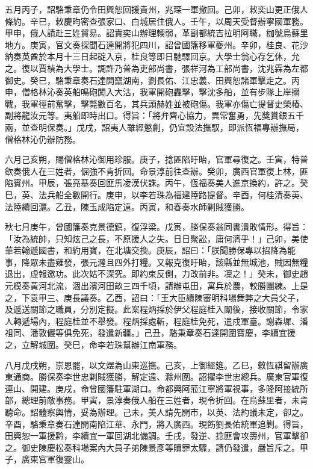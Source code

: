 \begin{pinyinscope}
五月丙子，詔駱秉章仍令田興恕回援貴州，兆琛一軍撤回。己卯，敕奕山更正俄人條約。辛巳，敕慶昀密查張家口、白城居住俄人。壬午，以周天受督辦寧國軍務。甲申，俄人請赴三姓貿易。詔責奕山辦理輭弱，革副都統吉拉明阿職，枷號烏蘇里地方。庚寅，官文奏探聞石達開將犯四川，詔曾國籓移軍夔州。辛卯，桂良、花沙納奏英酋於本月十三日起碇入京，桂良等即日馳驛回京。大學士翁心存乞休，允之。復以賈楨為大學士。調許乃普為吏部尚書，張祥河為工部尚書，沈兆霖為左都御史。癸巳，駱秉章奏石達開竄湖南，劉長佑、江忠義、田興恕諸軍擊走之。丙申，僧格林沁奏英船鳴砲闖入大沽，我軍開砲轟擊，擊沈多船，並有步隊上岸搦戰，我軍徑前奮擊，擊斃數百名，其兵頭赫姓並被砲傷。我軍亦傷亡提督史榮椿、副將龍汝元等。夷船即時出口。得旨：「將弁齊心協力，異常奮勇，先獎賞銀五千兩，並查明保奏。」戊戌，詔夷人雖經懲創，仍宜設法撫馭，即派恆福專辦撫局，僧格林沁仍辦防務。

六月己亥朔，賜僧格林沁御用珍服。庚子，捻匪陷盱眙，官軍尋復之。壬寅，特普欽奏俄人在三姓者，倔強不肯折回。命景淳前往查辦。癸卯，廣西官軍復上林，匪陷賓州。甲辰，張亮基奏回匪馬凌漢伏誅。丙午，恆福奏美人進京換約，許之。癸巳，英、法兵船全數開行。庚申，以李若珠為福建陸路提督。辛酉，何桂清奏英、法陸續回滬。乙丑，陳玉成陷定遠。丙寅，和春奏水師剿賊獲勝。

秋七月庚午，曾國籓奏克景德鎮，復浮梁。戊寅，勝保奏翁同書潰敗情形。得旨：「汝為統帥，只知炫己之長，不原援人之失。日日聚訟，庸何濟乎！」己卯，美使華若翰遞國書，和約用寶，在北塘交換。庚辰，詔曰：「朕聞勝保專以招降為能事，降眾未盡薙發，張元漋且四外打糧。又報克復盱眙，該縣並無城池，賊因無糧退出，虛報邀功。此次姑不深究。即約束反側，力改前非。凜之！」癸未，御史趙元模奏黃河北流，涸出濱河田畝三四千頃，請辦屯田，寓兵於農，較勝團練。上是之，下袁甲三、庚長議奏。乙酉，詔曰：「王大臣續陳審明科場舞弊之大員父子，及遞送關節之職員，分別定擬。此案程炳採於伊父程庭桂入闈後，接收關節，令家人轉遞場內，程庭桂並不舉發。程炳採處斬，程庭桂免死，遣戍軍臺。謝森墀、潘祖同、潘敦儼等俱免死，發遣新疆。」己丑，駱秉章奏石達開圍寶慶，李續宜援之，立解城圍。癸巳，命李若珠幫辦江南軍務。

八月戊戌朔，崇恩罷，以文煜為山東巡撫。己亥，上御經筵。乙巳，敕恆祺留辦廣東通商。勝保奏李世忠剿賊獲勝，解定遠、滁州圍。詔擢李世忠總兵。廣東官軍復連山、開建。庚戌，命曾國籓駐軍湖口。命都興阿蒞江寧將軍視事，多隆阿接統所部，總理前敵事務。甲寅，景淳奏俄人船在三姓者，現令折回。在烏蘇里者，未肯聽命。詔體察輿情，妥為辦理。己未，美人請先開市，以英、法約議未定，卻之。辛酉，駱秉章奏石達開南陷江華、永門，將入廣西。現飭劉長佑統軍追剿。得旨，田興恕一軍援黔，李續宜一軍回湖北備調。壬戌，發逆、捻匪會攻壽州，官軍擊卻之。御史陳慶松奏科場案內大員子弟陳景彥等贖罪太驟，請仍發遣，嚴旨斥之。甲子，廣東官軍復靈山。


\end{pinyinscope}
